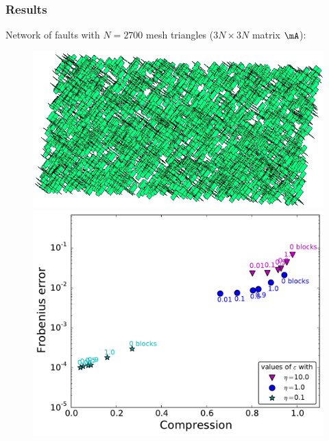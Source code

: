 \begin{frame}
\frametitle{Results}

\small

Network of \alert{faults} with $N=2700$ mesh triangles ($3N\times 3N$ matrix $\mA$):
\vspace{-5pt}
\begin{figure}
\centering
\begin{minipage}[c]{.4\linewidth}
\includegraphics[width=.35\textwidth]{../images/visu_maillage2700FracsV2D2.png}
\end{minipage}
\begin{minipage}[c]{.4\linewidth}
\includegraphics[width=.6\textwidth]{../images/graphe_compare_output_compression_18_08_2016matrice2700FracsV2D2.pdf}
\end{minipage}
\end{figure}

%
%

\end{frame}



